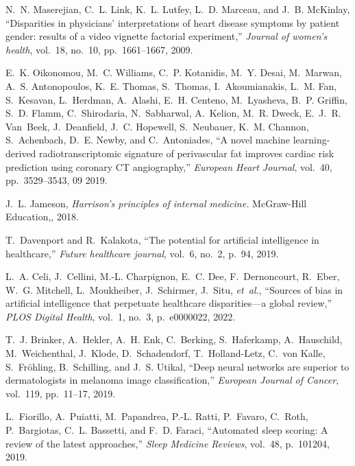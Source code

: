 \documentclass{article}
\begin{document}
\begin{thebibliography}{100}
	N.~N. Maserejian, C.~L. Link, K.~L. Lutfey, L.~D. Marceau, and J.~B. McKinlay,
	``Disparities in physicians' interpretations of heart disease symptoms by
	patient gender: results of a video vignette factorial experiment,'' {\em
		Journal of women's health}, vol.~18, no.~10, pp.~1661--1667, 2009.
	
	E.~K. Oikonomou, M.~C. Williams, C.~P. Kotanidis, M.~Y. Desai, M.~Marwan, A.~S.
	Antonopoulos, K.~E. Thomas, S.~Thomas, I.~Akoumianakis, L.~M. Fan,
	S.~Kesavan, L.~Herdman, A.~Alashi, E.~H. Centeno, M.~Lyasheva, B.~P. Griffin,
	S.~D. Flamm, C.~Shirodaria, N.~Sabharwal, A.~Kelion, M.~R. Dweck, E.~J.~R.
	Van~Beek, J.~Deanfield, J.~C. Hopewell, S.~Neubauer, K.~M. Channon,
	S.~Achenbach, D.~E. Newby, and C.~Antoniades, ``{A novel machine
		learning-derived radiotranscriptomic signature of perivascular fat improves
		cardiac risk prediction using coronary CT angiography},'' {\em European Heart
		Journal}, vol.~40, pp.~3529--3543, 09 2019.
	
	J.~L. Jameson, {\em Harrison's principles of internal medicine.}
	\newblock McGraw-Hill Education,, 2018.
	
	T.~Davenport and R.~Kalakota, ``The potential for artificial intelligence in
	healthcare,'' {\em Future healthcare journal}, vol.~6, no.~2, p.~94, 2019.
	
	L.~A. Celi, J.~Cellini, M.-L. Charpignon, E.~C. Dee, F.~Dernoncourt, R.~Eber,
	W.~G. Mitchell, L.~Moukheiber, J.~Schirmer, J.~Situ, {\em et~al.}, ``Sources
	of bias in artificial intelligence that perpetuate healthcare disparities—a
	global review,'' {\em PLOS Digital Health}, vol.~1, no.~3, p.~e0000022, 2022.
	
	T.~J. Brinker, A.~Hekler, A.~H. Enk, C.~Berking, S.~Haferkamp, A.~Hauschild,
	M.~Weichenthal, J.~Klode, D.~Schadendorf, T.~Holland-Letz, C.~{von Kalle},
	S.~Fröhling, B.~Schilling, and J.~S. Utikal, ``Deep neural networks are
	superior to dermatologists in melanoma image classification,'' {\em European
		Journal of Cancer}, vol.~119, pp.~11--17, 2019.
	
	L.~Fiorillo, A.~Puiatti, M.~Papandrea, P.-L. Ratti, P.~Favaro, C.~Roth,
	P.~Bargiotas, C.~L. Bassetti, and F.~D. Faraci, ``Automated sleep scoring: A
	review of the latest approaches,'' {\em Sleep Medicine Reviews}, vol.~48,
	p.~101204, 2019.
	

\end{thebibliography}
\end{document}
